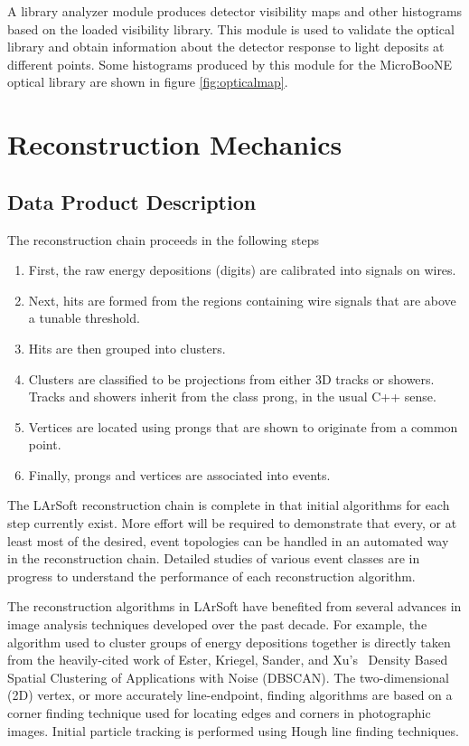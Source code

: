 \documentclass[12pt]{elsarticle}
\begin{document}
A library analyzer module produces detector visibility maps and other histograms based on the loaded visibility library.  This module is used to validate the optical library and obtain information about the detector response to light deposits at different points.  Some histograms produced by this module for the MicroBooNE optical library are shown in figure \ref{fig:opticalmap}.


\section{Reconstruction Mechanics}
\subsection{Data Product Description}
The reconstruction chain proceeds in the following steps
\begin{enumerate}
\item First, the raw energy depositions (digits) are calibrated into signals on wires.
\item Next, hits are formed from the regions containing wire signals that are above a tunable threshold.
\item Hits are then grouped into clusters.
\item Clusters are classified to be projections from either 3D tracks or showers. Tracks and showers inherit from the class prong, in the usual C++ sense.
\item Vertices are located using prongs that are shown to originate from a common point.
\item Finally, prongs and vertices are associated into events.
\end{enumerate}
The LArSoft reconstruction chain is complete in that initial algorithms for each step currently exist.  More effort will be required to demonstrate that every, or at least most of the desired, event topologies can be handled in an automated way in the reconstruction chain. Detailed studies of various event classes are in progress to understand the performance of each reconstruction algorithm.

The reconstruction algorithms in LArSoft have benefited from several advances in image analysis techniques developed over the past decade.  For example, the algorithm used to cluster groups of energy depositions together is directly taken from the heavily-cited work of Ester, Kriegel, Sander, and Xu's~\cite{ester} Density Based Spatial Clustering of Applications with Noise (DBSCAN). The two-dimensional (2D) vertex, or more accurately line-endpoint, finding algorithms are based on a corner finding technique used for locating edges and corners in photographic images.  Initial particle tracking is performed using Hough line finding techniques.
\end{document}
